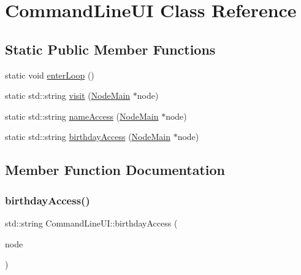 \hypertarget{class_command_line_u_i}{}\section{Command\+Line\+UI Class Reference}
\label{class_command_line_u_i}
\subsection*{Static Public Member Functions}
\begin{DoxyCompactItemize}
\item 
static void \hyperlink{class_command_line_u_i_ac72a09121b78bdf1ab1f457795fcf370}{enter\+Loop} ()
\item 
static std\+::string \hyperlink{class_command_line_u_i_aa3aa6bc65288fac3cdfa611094ab7646}{visit} (\hyperlink{class_node_main}{Node\+Main} $\ast$node)
\item 
static std\+::string \hyperlink{class_command_line_u_i_afaceee7574a4ed29efc107e2ab2c9087}{name\+Access} (\hyperlink{class_node_main}{Node\+Main} $\ast$node)
\item 
static std\+::string \hyperlink{class_command_line_u_i_a901204652cd0e1ada6aada345f30ecff}{birthday\+Access} (\hyperlink{class_node_main}{Node\+Main} $\ast$node)
\end{DoxyCompactItemize}


\subsection{Member Function Documentation}
\mbox{\label{class_command_line_u_i_a901204652cd0e1ada6aada345f30ecff}} 
\subsubsection{\texorpdfstring{birthday\+Access()}{birthdayAccess()}}
{\footnotesize\ttfamily std\+::string Command\+Line\+U\+I\+::birthday\+Access (\begin{DoxyParamCaption}\item[{\hyperlink{class_node_main}{Node\+Main} $\ast$}]{node }\end{DoxyParamCaption})\hspace{0.3cm}{\ttfamily [static]}}

